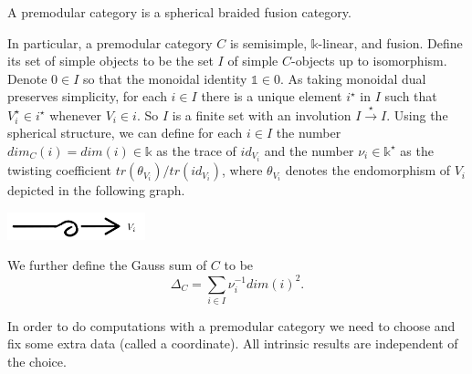 \begin{definition}\label{def/premodular-category}
  A premodular category is a spherical braided fusion category.
\end{definition}

\noindent In particular, a premodular category $C$ is semisimple,
$\mathbb{k}$-linear, and fusion. Define its set of simple objects to be
the set $I$ of simple $C$-objects up to isomorphism. Denote
$0 \in I$ so that the monoidal identity $\mathbb{1} \in 0$. As
taking monoidal dual preserves simplicity, for each $i \in I$
there is a unique element $i^{\star}$ in $I$ such that
$V_{i}^{\star} \in i^{\star}$ whenever $V_{i} \in i$. So $I$ is a
finite set with an involution $I \xrightarrow{\star} I$. Using
the spherical structure, we can define for each $i \in I$ the
number $dim_{C}(i) = dim(i) \in \mathbb{k}$ as the trace of
$id_{V_{i}}$ and the number $\nu_{i} \in \mathbb{k}^{\star}$ as
the twisting coefficient $tr(\theta_{V_{i}})/tr(id_{V_{i}})$,
where $\theta_{V_{i}}$ denotes the endomorphism of $V_{i}$
depicted in the following graph.
\begin{center}
  \includegraphics[height=0.8cm]{twist}
\end{center}
We further define the Gauss sum of $C$ to be
$$\Delta_{C} = \sum_{i \in I} \nu_{i}^{-1}dim(i)^{2}.$$

\noindent In order to do computations with a premodular category
we need to choose and fix some extra data (called a coordinate).
All intrinsic results are independent of the choice.

